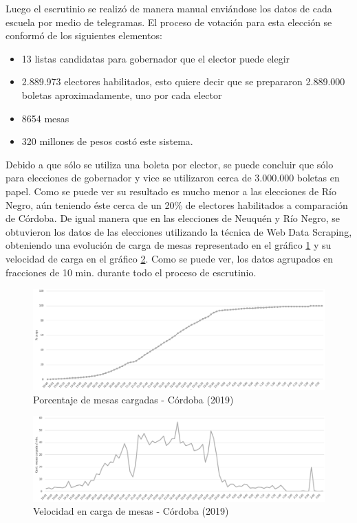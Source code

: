 Luego el escrutinio se realizó de manera manual enviándose los datos de cada escuela por medio de telegramas. El proceso de votación para esta elección se conformó de los siguientes elementos: 
\begin{itemize}
    \item 13 listas candidatas para gobernador que el elector puede elegir
    \item 2.889.973 electores habilitados, esto quiere decir que se prepararon 2.889.000 boletas aproximadamente, uno por cada elector
    \item 8654 mesas
    \item 320 millones de pesos costó este sistema. 
\end{itemize}
Debido a que sólo se utiliza una boleta por elector, se puede concluir que sólo para elecciones de gobernador y vice se utilizaron cerca de 3.000.000 boletas en papel. Como se puede ver su resultado es mucho menor a las elecciones de Río Negro, aún teniendo éste cerca de un 20\% de electores habilitados a comparación de Córdoba. De igual manera que en las elecciones de Neuquén y Río Negro, se obtuvieron los datos de las elecciones utilizando la técnica de Web Data Scraping, obteniendo una evolución de carga de mesas representado en el gráfico \ref{graf:porcentajeCordoba} y su velocidad de carga en el gráfico \ref{graf:velocidadCordoba}. Como se puede ver, los datos agrupados en fracciones de 10 min. durante todo el proceso de escrutinio.

\begin{figure}[h!]
  \includegraphics[width=1\textwidth]{img/E4YqKc5Tcu.png}
  \caption{Porcentaje de mesas cargadas - Córdoba (2019)}
  \label{graf:porcentajeCordoba}
\end{figure}

\begin{figure}[h!]
  \includegraphics[width=1\textwidth]{img/9rEiyqeSFw.png}
  \caption{Velocidad en carga de mesas - Córdoba (2019)}
  \label{graf:velocidadCordoba}
\end{figure}


